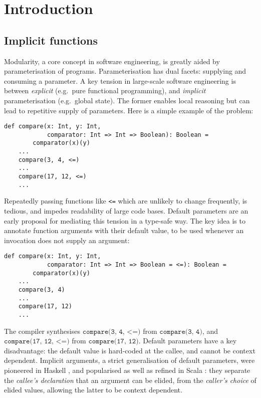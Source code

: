 \section{Introduction}

\subsection{Implicit functions}
Modularity, a core concept in software engineering, is greatly aided by
parameterisation of programs. Parameterisation has dual facets: supplying and
consuming a parameter.  A key tension in large-scale software engineering is
between \emph{explicit} (e.g.~pure functional programming), and \emph{implicit}
parameterisation (e.g.~global state).  The former enables local reasoning but
can lead to repetitive supply of parameters.  Here is a simple example of the
problem:

\begin{minipage}{\linewidth}
\begin{lstlisting}[mathescape]
    def compare(x: Int, y: Int,
            comparator: Int => Int => Boolean): Boolean =
        comparator(x)(y)
    ...
    compare(3, 4, <=)
    ...
    compare(17, 12, <=)
    ...
\end{lstlisting}
\end{minipage}

Repeatedly passing functions like \texttt{<=} which are unlikely to change
frequently, is tedious, and impedes readability of large code bases. Default
parameters  are an early proposal for mediating this tension in a type-safe way.
The key idea is to annotate function arguments with their default value, to be
used whenever an invocation does not supply an argument:

\begin{minipage}{\linewidth}
\begin{lstlisting}[mathescape]
    def compare(x: Int, y: Int,
            comparator: Int => Int => Boolean = <=): Boolean =
        comparator(x)(y)
    ...
    compare(3, 4)
    ...
    compare(17, 12)
    ...
\end{lstlisting}
\end{minipage}

The compiler synthesises $\texttt{compare(3, 4, <=)}$ from $\texttt{compare(3,
4)}$, and $\texttt{compare(17, 12, <=)}$ from $\texttt{compare(17, 12)}$.
Default parameters have a key disadvantage: the default value is hard-coded at
the callee, and cannot be context dependent. Implicit arguments, a strict
generalisation of default parameters, were pioneered in Haskell \cite{LLMS00},
and popularised as well as refined  in Scala \cite{OBLB18}: they separate the
\emph{callee's declaration} that an argument can be elided, from the
\emph{caller's choice} of elided values, allowing the latter to be context
dependent.

